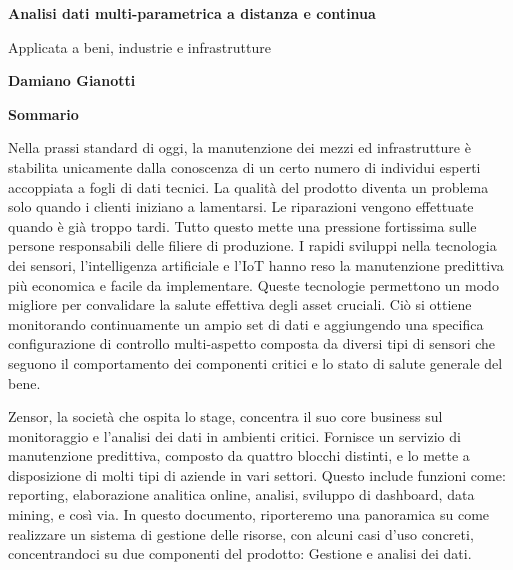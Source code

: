 \begin{center}
    \Large
    \textbf{Analisi dati multi-parametrica a distanza e continua}
        
    \vspace{0.4cm}
    \large
    Applicata a beni, industrie e infrastrutture
        
    \vspace{0.4cm}
    \textbf{Damiano Gianotti}
       
    \vspace{0.9cm}
    \textbf{Sommario}
\end{center}
Nella prassi standard di oggi, la manutenzione dei mezzi ed infrastrutture è stabilita unicamente dalla conoscenza di un certo numero di individui esperti accoppiata a fogli di dati tecnici.
La qualità del prodotto diventa un problema solo quando i clienti iniziano a lamentarsi. Le riparazioni vengono effettuate quando è già troppo tardi. Tutto questo mette una pressione fortissima sulle persone responsabili delle filiere di produzione. 
I rapidi sviluppi nella tecnologia dei sensori, l'intelligenza artificiale e l'\acl{IoT} hanno reso la manutenzione predittiva più economica e facile da implementare. Queste tecnologie permettono un modo migliore per convalidare la salute effettiva degli asset cruciali. 
Ciò si ottiene monitorando continuamente un ampio set di dati e aggiungendo una specifica configurazione di controllo multi-aspetto composta da diversi tipi di sensori che seguono il comportamento dei componenti critici e lo stato di salute generale del bene.

Zensor, la società che ospita lo stage, concentra il suo core business sul monitoraggio e l'analisi dei dati in ambienti critici. Fornisce un servizio di manutenzione predittiva, composto da quattro blocchi distinti, e lo mette a disposizione di molti tipi di aziende in vari settori. 
Questo include funzioni come: reporting, elaborazione analitica online, analisi, sviluppo di dashboard, data mining, e così via.
In questo documento, riporteremo una panoramica su come realizzare un sistema di gestione delle risorse, con alcuni casi d'uso concreti, concentrandoci su due componenti del prodotto: Gestione e analisi dei dati.
\cleardoublepage

